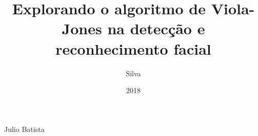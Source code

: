 \title{Explorando o algoritmo de Viola-Jones na detecção e reconhecimento facial}


\author{Silva}{Julio Batista}
\date{2018}
\maketitle